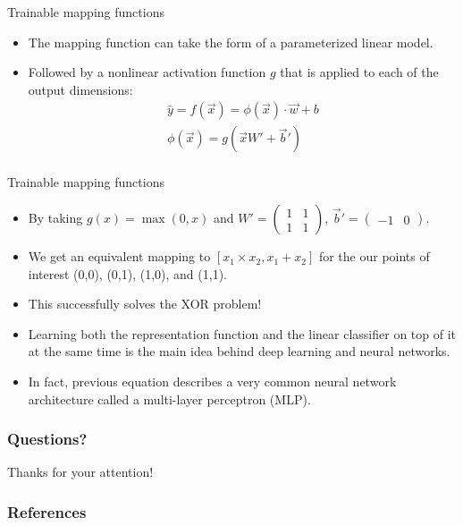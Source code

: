 \documentclass[handout]{beamer}
\begin{document}
\begin{frame}{Trainable mapping functions}
\begin{scriptsize}
\begin{itemize}
\item The mapping function can take the form of a parameterized linear model.
\item Followed by a nonlinear activation function $g$ that is applied to each of the output dimensions:
\begin{equation}
\begin{split}
\hat{y} = f(\vec{x}) = \phi(\vec{x}) \cdot \vec{w} +b \\
\phi(\vec{x}) = g(\vec{x}W'+ \vec{b}') \\
\end{split} 
\end{equation}
\end{itemize}
\end{scriptsize}
\end{frame}



\begin{frame}{Trainable mapping functions}
\begin{scriptsize}
\begin{itemize}
\item By taking $g(x) = \operatorname{max}(0, x)$ and $W' = \begin{pmatrix}
    1 & 1 \\ 1 & 1 \end{pmatrix}$, $\vec{b}' = \begin{pmatrix}
    -1 & 0 \end{pmatrix}$.
\item We get an equivalent mapping to $[x_1 \times x_2, x_1 + x_2]$  for the our points of interest (0,0), (0,1), (1,0), and (1,1).
\item This successfully solves the XOR problem!
\item Learning both the representation function and the linear classifier on top of it at the same time is the main idea behind deep learning and neural networks.
\item In fact, previous equation describes a very common neural network architecture called a multi-layer perceptron (MLP).
\end{itemize}
\end{scriptsize}
\end{frame}




\begin{frame}
\frametitle{Questions?}
\begin{center}\LARGE Thanks for your attention!\\ \end{center}



\end{frame}

\begin{frame}[allowframebreaks]\scriptsize
\frametitle{References}


%
\end{frame}  


\end{document}
